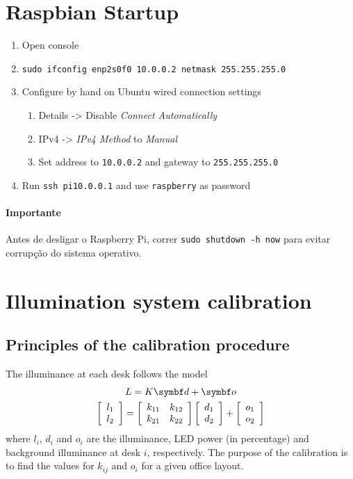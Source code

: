 \documentclass[english,fira]{ist-report}
\begin{document}
\section{Raspbian Startup}
\begin{enumerate}
	\item Open console
	\item \texttt{sudo ifconfig enp2s0f0 10.0.0.2 netmask 255.255.255.0}
	\item Configure by hand on Ubuntu wired connection settings
	\begin{enumerate}
		\item Details -> Disable \textit{Connect Automatically}
		\item IPv4 -> \textit{IPv4 Method} to \textit{Manual}
		\item Set address to \texttt{10.0.0.2} and gateway to \texttt{255.255.255.0}
	\end{enumerate}
	\item Run \texttt{ssh pi\@10.0.0.1} and use \texttt{raspberry} as password
\end{enumerate}

\paragraph{Importante} Antes de desligar o Raspberry Pi, correr \texttt{sudo shutdown -h now} para evitar corrupção do sistema operativo.

\section{Illumination system calibration}

\subsection{Principles of the calibration procedure}

The illuminance at each desk follows the model
\begin{gather}
  L = K \matr{d} + \matr{o} \nonumber \\ 
  \left[\begin{array}{c} l_{1}\\ l_{2} \end{array}\right] =
  \left[\begin{array}{cc}
	k_{11} & k_{12}\\
	k_{21} & k_{22}
  \end{array}\right]
  \left[\begin{array}{c} d_{1}\\ d_{2}\end{array}\right]+
  \left[\begin{array}{c} o_{1}\\ o_{2} \end{array}\right]
  \label{eq:model}
\end{gather}
where $l_i$, $d_i$ and $o_i$ are the illuminance, LED power (in percentage) and background illuminance at desk $i$, respectively. The purpose of the calibration is to find the values for $k_{ij}$ and $o_i$ for a given office layout.
\end{document}
